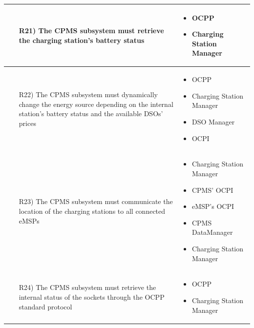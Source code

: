 \documentclass[table, 12pt]{article}
\begin{document}
\begin{longtable}{|p{}|p{}|}
    \begin{itemize}
        \item[R21)] The CPMS subsystem must retrieve the charging station's battery status
    \end{itemize}
    & 
    \begin{itemize}
        \item OCPP
        \item Charging Station Manager
    \end{itemize}
    \\\hline

    \begin{itemize}
        \item[R22)] The CPMS subsystem must dynamically change the energy source depending on the internal station's battery status and the available DSOs' prices
    \end{itemize}
    & 
    \begin{itemize}
        \item OCPP
        \item Charging Station Manager
        \item DSO Manager
        \item OCPI %
    \end{itemize}
    \\\hline

    \begin{itemize}
        \item[R23)] The CPMS subsystem must communicate the location of the charging stations to all connected eMSPs
    \end{itemize}
    & 
    \begin{itemize}
        \item Charging Station Manager
        \item CPMS' OCPI
        \item eMSP's OCPI %
        \item CPMS DataManager
        \item Charging Station Manager
    \end{itemize}
    \\\hline

    \begin{itemize}
        \item[R24)] The CPMS subsystem must retrieve the internal status of the sockets through the OCPP standard protocol
    \end{itemize}
    & 
    \begin{itemize}
        \item OCPP
        \item Charging Station Manager
    \end{itemize}
    \\\hline


\end{longtable}
\end{document}
